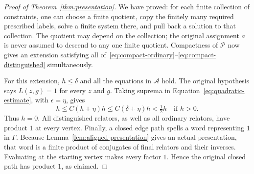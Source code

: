 \begin{proof}[Proof of Theorem~\ref{thm:presentation}]
We have proved: for each finite collection of constraints, one can
choose a finite quotient, copy the finitely many required prescribed
labels, solve a finite system there, and pull back a solution to that
collection.  The quotient may depend on the collection; the original
assignment $a$ is never assumed to descend to any one finite quotient.
Compactness of $\mathscr P$ now gives an extension satisfying
all of~\eqref{eq:compact-ordinary}--\eqref{eq:compact-distinguished}
simultaneously.

For this extension, $h\le\delta$ and all the equations in $\mathcal A$
hold.  The original hypothesis says $L(z,g)=1$ for every $z$ and $g$.
Taking suprema in Equation~\eqref{eq:quadratic-estimate}, with
$\epsilon=\eta$, gives
\[
 h\le C(h+\eta)h\le C(\delta+\eta)h<\tfrac12h
 \quad\text{if }h>0.
\]
Thus $h=0$.  All distinguished relators, as well as all ordinary
relators, have product $1$ at every vertex.
Finally, a closed edge path spells a word representing $1$ in $\Gamma$.
Because Lemma~\ref{lem:aligned-presentation} gives an actual presentation,
that word is a finite product of conjugates of final relators and their
inverses.  Evaluating at the starting vertex makes every factor $1$.
Hence the original closed path has product $1$, as claimed.
\end{proof}

